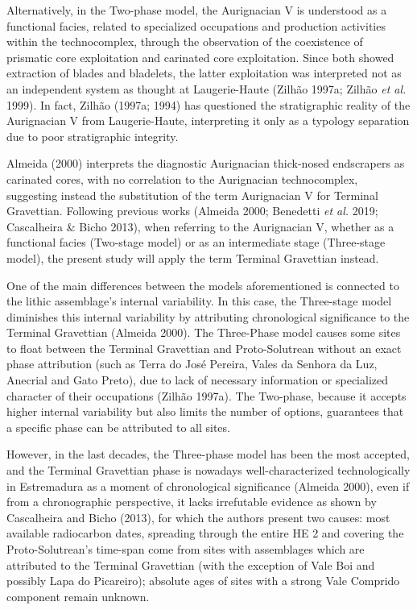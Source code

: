 \documentclass[12pt,twoside]{reedthesis}
\begin{document}
Alternatively, in the Two-phase model, the Aurignacian V is understood as a functional facies, related to specialized occupations and production activities within the technocomplex, through the observation of the coexistence of prismatic core exploitation and carinated core exploitation. Since both showed extraction of blades and bladelets, the latter exploitation was interpreted not as an independent system as thought at Laugerie-Haute (Zilhão 1997a; Zilhão \emph{et al.} 1999). In fact, Zilhão (1997a; 1994) has questioned the stratigraphic reality of the Aurignacian V from Laugerie-Haute, interpreting it only as a typology separation due to poor stratigraphic integrity.

Almeida (2000) interprets the diagnostic Aurignacian thick-nosed endscrapers as carinated cores, with no correlation to the Aurignacian technocomplex, suggesting instead the substitution of the term Aurignacian V for Terminal Gravettian. Following previous works (Almeida 2000; Benedetti \emph{et al.} 2019; Cascalheira \& Bicho 2013), when referring to the Aurignacian V, whether as a functional facies (Two-stage model) or as an intermediate stage (Three-stage model), the present study will apply the term Terminal Gravettian instead.

One of the main differences between the models aforementioned is connected to the lithic assemblage's internal variability. In this case, the Three-stage model diminishes this internal variability by attributing chronological significance to the Terminal Gravettian (Almeida 2000). The Three-Phase model causes some sites to float between the Terminal Gravettian and Proto-Solutrean without an exact phase attribution (such as Terra do José Pereira, Vales da Senhora da Luz, Anecrial and Gato Preto), due to lack of necessary information or specialized character of their occupations (Zilhão 1997a). The Two-phase, because it accepts higher internal variability but also limits the number of options, guarantees that a specific phase can be attributed to all sites.

However, in the last decades, the Three-phase model has been the most accepted, and the Terminal Gravettian phase is nowadays well-characterized technologically in Estremadura as a moment of chronological significance (Almeida 2000), even if from a chronographic perspective, it lacks irrefutable evidence as shown by Cascalheira and Bicho (2013), for which the authors present two causes: most available radiocarbon dates, spreading through the entire HE 2 and covering the Proto-Solutrean's time-span come from sites with assemblages which are attributed to the Terminal Gravettian (with the exception of Vale Boi and possibly Lapa do Picareiro); absolute ages of sites with a strong Vale Comprido component remain unknown.
\end{document}
